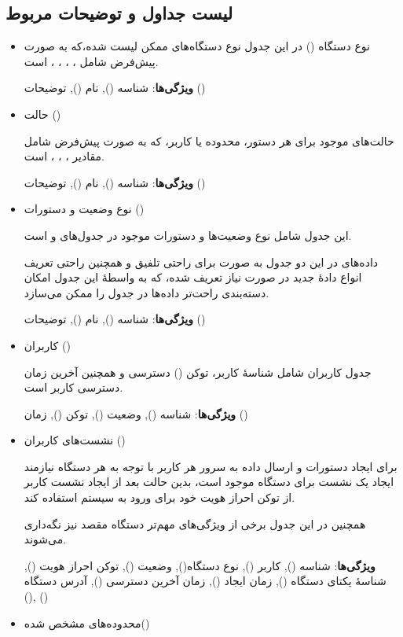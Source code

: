 \subsection{لیست جداول و توضیحات مربوط}\label{sub2:sec1:chap3}

\begin{itemize}[nosep]
	\item
	نوع دستگاه () در این جدول نوع دستگاه‌های ممکن لیست شده،‌که
	به صورت پیش‌فرض شامل ، ، ، ،  است.

	\textbf{ویژگی‌ها}: شناسه (), نام (), توضیحات ()
	\item
	حالت ()

	حالت‌های موجود برای هر دستور، محدوده یا کاربر، که به صورت پیش‌فرض شامل
	مقادیر ، ، ،  است.

	\textbf{ویژگی‌ها}: شناسه (), نام (), توضیحات ()
	\item
	نوع وضعیت و دستورات ()

	این جدول شامل نوع وضعیت‌ها و دستورات موجود در جدول‌های  و
	 است.

	داده‌های در این دو جدول به صورت  برای راحتی تلفیق و همچنین راحتی
	تعریف انواع دادهٔ جدید در صورت نیاز تعریف شده، که به واسطهٔ این جدول
	امکان دسته‌بندی راحت‌تر داده‌ها در جدول  را ممکن می‌سازد.

	\textbf{ویژگی‌ها}: شناسه (), نام (), توضیحات ()
	\item
	کاربران ()

	جدول کاربران شامل شناسهٔ کاربر، توکن () دسترسی و همچنین آخرین
	زمان دسترسی کاربر است.

	\textbf{ویژگی‌ها}: شناسه (), وضعیت (), توکن (), زمان ()
	\item
	نشست‌های کاربران ()

	برای ایجاد دستورات و ارسال داده به سرور هر کاربر با توجه به هر دستگاه
	نیازمند ایجاد یک نشست برای دستگاه موجود است، بدین حالت بعد از ایجاد
	نشست کاربر از توکن احراز هویت خود برای ورود به سیستم استفاده کند.

	همچنین در این جدول برخی از ویژگی‌های مهم‌تر دستگاه مقصد نیز نگه‌داری
	می‌شوند.

	\textbf{ویژگی‌ها}: شناسه (), کاربر (), نوع دستگاه(), وضعیت
	(), توکن احراز هویت (), شناسهٔ یکتای دستگاه (), زمان
	ایجاد (), زمان آخرین دسترسی (), آدرس  دستگاه (),
	()
	\item
	محدوده‌های مشخص شده()


\end{itemize}
